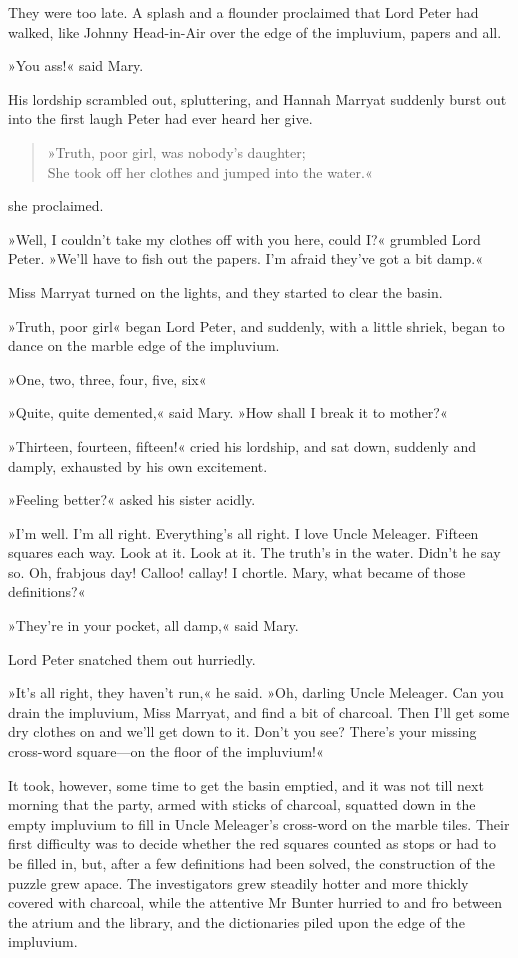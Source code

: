 They were too late. A splash and a flounder proclaimed that Lord Peter had walked, like Johnny Head-in-Air over the edge of the impluvium, papers and all.

»You ass!« said Mary.

His lordship scrambled out, spluttering, and Hannah Marryat suddenly burst out into the first laugh Peter had ever heard her give.

\begin{quote}
»Truth, poor girl, was nobody's daughter;\\
She took off her clothes and jumped into the water.«
\end{quote}
she proclaimed.

»Well, I couldn't take my clothes off with you here, could I?« grumbled Lord Peter. »We'll have to fish out the papers. I'm afraid they've got a bit damp.«

Miss Marryat turned on the lights, and they started to clear the basin.

»Truth, poor girl\longdash« began Lord Peter, and suddenly, with a little shriek, began to dance on the marble edge of the impluvium.

»One, two, three, four, five, six\longdash«

»Quite, quite demented,« said Mary. »How shall I break it to mother?«

»Thirteen, fourteen, fifteen!« cried his lordship, and sat down, suddenly and damply, exhausted by his own excitement.

»Feeling better?« asked his sister acidly.

»I'm well. I'm all right. Everything's all right. I love Uncle Meleager. Fifteen squares each way. Look at it. Look at it. The truth's in the water. Didn't he say so. Oh, frabjous day! Calloo! callay! I chortle. Mary, what became of those definitions?«

»They're in your pocket, all damp,« said Mary.

Lord Peter snatched them out hurriedly.

»It's all right, they haven't run,« he said. »Oh, darling Uncle Meleager. Can you drain the impluvium, Miss Marryat, and find a bit of charcoal. Then I'll get some dry clothes on and we'll get down to it. Don't you see? There's your missing cross-word square—on the floor of the impluvium!«

It took, however, some time to get the basin emptied, and it was not till next morning that the party, armed with sticks of charcoal, squatted down in the empty impluvium to fill in Uncle Meleager's cross-word on the marble tiles. Their first difficulty was to decide whether the red squares counted as stops or had to be filled in, but, after a few definitions had been solved, the construction of the puzzle grew apace. The investigators grew steadily hotter and more thickly covered with charcoal, while the attentive Mr Bunter hurried to and fro between the atrium and the library, and the dictionaries piled upon the edge of the impluvium.

